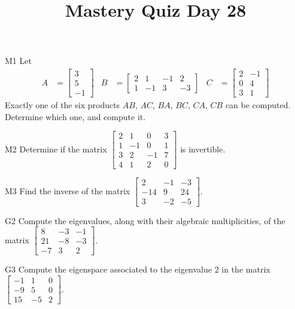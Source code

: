 \documentclass{sbgLAquiz}
\title{Mastery Quiz Day 28 }
\begin{document}
\begin{problem}{M1}
Let
\begin{align*}
A &= \begin{bmatrix} 3 \\ 5 \\ -1  \end{bmatrix} & B&=\begin{bmatrix}  2 & 1 & -1 & 2 \\ 1 & -1 & 3 & -3  \end{bmatrix} & C &= \begin{bmatrix} 2 & -1 \\ 0 & 4 \\ 3 & 1 \end{bmatrix} \end{align*}
Exactly one of the six products $AB$, $AC$, $BA$, $BC$, $CA$, $CB$ can be computed.  Determine which one, and compute it.
\end{problem}

\begin{problem}{M2}
Determine if the matrix $\begin{bmatrix} 2 & 1 & 0 & 3 \\ 1 & -1 & 0 & 1 \\ 3 & 2 & -1 & 7 \\ 4 & 1 & 2 & 0 \end{bmatrix}$ is invertible.
\end{problem}
\newpage

\begin{problem}{M3}
  Find the inverse of the matrix
  \(\begin{bmatrix}
    2 & -1 & -3  \\
    -14 & 9 & 24  \\
    3 & -2 & -5
  \end{bmatrix}\).
\end{problem}

\begin{problem}{G2}
Compute the eigenvalues, along with their algebraic multiplicities, of the matrix $ \begin{bmatrix} 8 & -3 & -1 \\ 21 & -8 & -3 \\ -7 & 3 & 2\end{bmatrix}$.
\end{problem}
\newpage

\begin{problem}{G3}
Compute the eigenspace associated to the eigenvalue $2$ in the matrix $\begin{bmatrix} -1 & 1 & 0 \\ -9 & 5 & 0 \\ 15 & -5 & 2 \end{bmatrix}$.
\end{problem}
\end{document}
